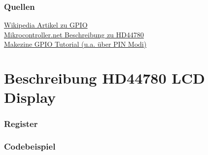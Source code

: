 \documentclass[a4paper,11pt]{article}
\begin{document}
\section*{Quellen}
\href{https://en.wikipedia.org/wiki/General-purpose_input/output}{Wikipedia Artikel zu GPIO}\\
\href{http://www.mikrocontroller.net/articles/HD44780}{Mikrocontroller.net Beschreibung zu HD44780}\\
\href{http://makezine.com/projects/tutorial-raspberry-pi-gpio-pins-and-python/}{Makezine GPIO Tutorial (u.a. über PIN Modi)}

\part{Beschreibung HD44780 LCD Display}
\section{Register}

\section{Codebeispiel}
\end{document}

